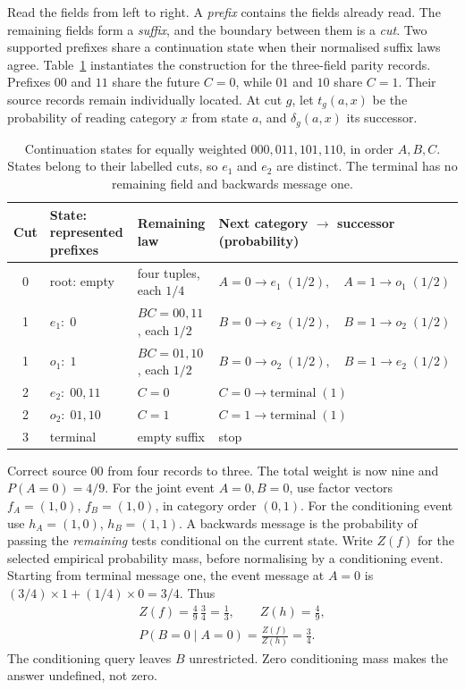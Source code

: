 \documentclass[reprint,aps,prx,superscriptaddress,nofootinbib,longbibliography]{revtex4-2}
\begin{document}
Read the fields from left to right.
A \emph{prefix} contains the fields already read.
The remaining fields form a \emph{suffix}, and the boundary between them is a \emph{cut}.
Two supported prefixes share a continuation state when their normalised suffix laws agree.
Table~\ref{tab:dm-states} instantiates the construction for the three-field parity records.
Prefixes \(00\) and \(11\) share the future \(C=0\), while \(01\) and \(10\) share \(C=1\).
Their source records remain individually located.
At cut \(g\), let \(t_g(a,x)\) be the probability of reading category \(x\) from state \(a\), and \(\delta_g(a,x)\) its successor.
\begin{table}[t]
\caption{Continuation states for equally weighted \(000,011,101,110\), in order \(A,B,C\).
States belong to their labelled cuts, so \(e_1\) and \(e_2\) are distinct.
The terminal has no remaining field and backwards message one.}
\label{tab:dm-states}
\begin{ruledtabular}
\begin{tabular}{clll}
Cut & State: represented prefixes & Remaining law & Next category \(\to\) successor (probability)\\
\hline
0 & root: empty & four tuples, each \(1/4\) & \(A=0\to e_1\;(1/2),\quad A=1\to o_1\;(1/2)\)\\
1 & \(e_1:\;0\) & \(BC=00,11\), each \(1/2\) & \(B=0\to e_2\;(1/2),\quad B=1\to o_2\;(1/2)\)\\
1 & \(o_1:\;1\) & \(BC=01,10\), each \(1/2\) & \(B=0\to o_2\;(1/2),\quad B=1\to e_2\;(1/2)\)\\
2 & \(e_2:\;00,11\) & \(C=0\) & \(C=0\to\mathrm{terminal}\;(1)\)\\
2 & \(o_2:\;01,10\) & \(C=1\) & \(C=1\to\mathrm{terminal}\;(1)\)\\
3 & terminal & empty suffix & stop\\
\end{tabular}
\end{ruledtabular}
\end{table}

Correct source 00 from four records to three.
The total weight is now nine and \(P(A=0)=4/9\).
For the joint event \(A=0,B=0\), use factor vectors \(f_A=(1,0)\), \(f_B=(1,0)\), in category order \((0,1)\).
For the conditioning event use \(h_A=(1,0)\), \(h_B=(1,1)\).
A backwards message is the probability of passing the \emph{remaining} tests conditional on the current state.
Write \(Z(f)\) for the selected empirical probability mass, before normalising by a conditioning event.
Starting from terminal message one, the event message at \(A=0\) is
\((3/4)\times1+(1/4)\times0=3/4\).
Thus
\begin{equation}
 \begin{gathered}
 Z(f)=\frac49\,\frac34=\frac13,\qquad Z(h)=\frac49,\\
 P(B=0\mid A=0)=\frac{Z(f)}{Z(h)}=\frac34 .
 \end{gathered}
 \label{eq:worked}
\end{equation}
The conditioning query leaves \(B\) unrestricted.
Zero conditioning mass makes the answer undefined, not zero.
\end{document}
